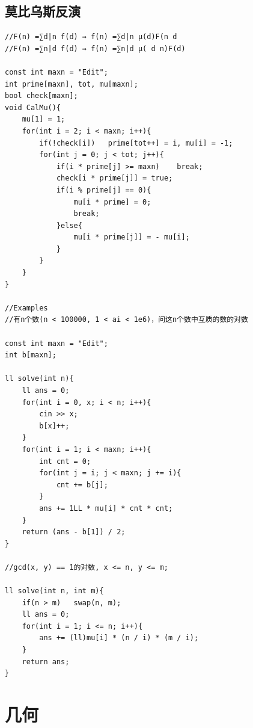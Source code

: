 \documentclass[twoside]{article}
\begin{document}
\subsection{莫比乌斯反演}
\begin{lstlisting}
//F(n) =∑d|n f(d) ⇒ f(n) =∑d|n µ(d)F(n d 
//F(n) =∑n|d f(d) ⇒ f(n) =∑n|d µ( d n)F(d) 

const int maxn = "Edit";
int prime[maxn], tot, mu[maxn];
bool check[maxn];
void CalMu(){
	mu[1] = 1;
	for(int i = 2; i < maxn; i++){
		if(!check[i])	prime[tot++] = i, mu[i] = -1;
		for(int j = 0; j < tot; j++){
			if(i * prime[j] >= maxn)	break;
			check[i * prime[j]] = true;
			if(i % prime[j] == 0){
				mu[i * prime] = 0;
				break;
			}else{
				mu[i * prime[j]] = - mu[i];
			}
		}
	}
}

//Examples
//有n个数(n < 100000, 1 < ai < 1e6)，问这n个数中互质的数的对数

const int maxn = "Edit";
int b[maxn];

ll solve(int n){
	ll ans = 0;
	for(int i = 0, x; i < n; i++){
		cin >> x;
		b[x]++;
	}
	for(int i = 1; i < maxn; i++){
		int cnt = 0;
		for(int j = i; j < maxn; j += i){
			cnt += b[j];
		}
		ans += 1LL * mu[i] * cnt * cnt;
	}
	return (ans - b[1]) / 2;
}

//gcd(x, y) == 1的对数, x <= n, y <= m;

ll solve(int n, int m){
	if(n > m)	swap(n, m);
	ll ans = 0;
	for(int i = 1; i <= n; i++){
		ans += (ll)mu[i] * (n / i) * (m / i);
	}
	return ans;
}\end{lstlisting}
\clearpage\section{几何}
\end{document}
